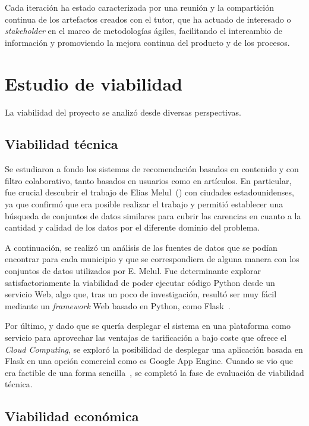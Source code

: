 Cada iteración ha estado caracterizada por una reunión y la compartición continua de los artefactos creados con el tutor, que ha actuado de interesado o \textit{stakeholder} en el marco de metodologías ágiles, facilitando el intercambio de información y promoviendo la mejora continua del producto y de los procesos.

\section{Estudio de viabilidad}

La viabilidad del proyecto se analizó desde diversas perspectivas.

\subsection{Viabilidad técnica}

Se estudiaron a fondo los sistemas de recomendación basados en contenido y con filtro colaborativo, tanto basados en usuarios como en artículos. En particular, fue crucial descubrir el trabajo de Elias Melul~(\cite{US1, US2, US3}) con ciudades estadounidenses, ya que confirmó que era posible realizar el trabajo y permitió establecer una búsqueda de conjuntos de datos similares para cubrir las carencias en cuanto a la cantidad y calidad de los datos por el diferente dominio del problema.

A continuación, se realizó un análisis de las fuentes de datos que se podían encontrar para cada municipio y que se correspondiera de alguna manera con los conjuntos de datos utilizados por E. Melul. Fue determinante explorar satisfactoriamente la viabilidad de poder ejecutar código Python desde un servicio Web, algo que, tras un poco de investigación, resultó ser muy fácil mediante un \textit{framework} Web basado en Python, como Flask~\cite{flask_so}.

Por último, y dado que se quería desplegar el sistema en una plataforma como servicio para aprovechar las ventajas de tarificación a bajo coste que ofrece el \textit{Cloud Computing}, se exploró la posibilidad de desplegar una aplicación basada en Flask en una opción comercial como es Google App Engine. Cuando se vio que era factible de una forma sencilla~\cite{flask_app_engine}, se completó la fase de evaluación de viabilidad técnica.

\subsection{Viabilidad económica}

